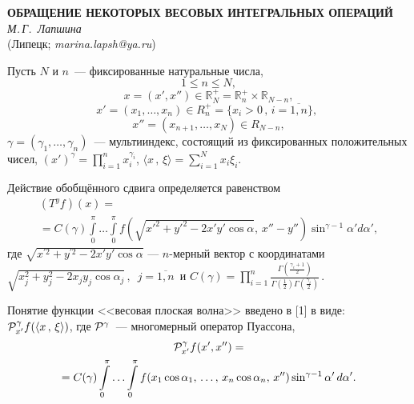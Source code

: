 \begin{center}{
	\bf
	ОБРАЩЕНИЕ НЕКОТОРЫХ ВЕСОВЫХ ИНТЕГРАЛЬНЫХ ОПЕРАЦИЙ
} \\
{\it М.\,Г.~Лапшина } \\
(Липецк; {\it marina.lapsh@ya.ru})
\end{center}


Пусть $N$ и $n$~--- фиксированные натуральные числа,
$$1\leqslant n\leqslant N,$$
$$x=(x',x'')\in \mathbb{R}_N^+=\mathbb{R}_n^+\times\mathbb{R}_{N-n},$$
$$
x'=(x_1,\ldots,x_n)\in R_n^+=\{x_i>0\,,\, i=\overline{1,n}\},\,\,
$$
$$
x''=(x_{n+1},\ldots,x_N)\in R_{N-n},
$$
$\gamma=(\gamma_1,\ldots,\gamma_n)$~--- мультииндекс, состоящий из
фиксированных положительных чисел, $(x')^\gamma=\prod_{i=1}^n x_i^{\gamma_i}$,
$\langle x\,,\,\xi\rangle{=}\sum_{i=1}^{N}x_i\xi_i$.

Действие обобщённого сдвига определяется  равенством
\begin{multline*}
(T^y f)(x)=
\\=
C(\gamma)\int\limits_{0}^{\pi}
\ldots \int\limits_{0}^{\pi}
f\left(\sqrt{x'^2{+}y'^2{-}2x'y'\cos\alpha},\,
 x''{-}y''\right)\sin^{\gamma-1}\alpha' d\alpha',
\end{multline*}
где $\sqrt{x^{'2}+y^{'2}-2x'y'\cos\alpha}$ --- $n$-мерный вектор  с координатами\\
$\sqrt{x_j^{2}+y_j^{2}-2x_jy_j\cos\alpha_j}\,,\,\,\, j=\overline{1,n}$\, и
$
C(\gamma)=\prod\limits_{i=1}^n\frac{\Gamma\left(\frac{\gamma_i+1}{2}\right)}
{\Gamma\left(\frac{1}{2}\right)\Gamma\left(\frac{\gamma_i}{2}\right)}\,.
$

Понятие функции <<весовая плоская волна>> введено в [1] в виде:
${\cal P}^\gamma_{x'} f(\langle x\,,\,\xi\rangle)$,
где ${\cal P}^\gamma$~--- многомерный оператор Пуассона,
\begin{multline*}
{\cal P}^\gamma_{x'} f(x',x'')=
\\=
C(\gamma)
\int\limits_0^\pi\ldots\int\limits_0^\pi f(x_1\cos\alpha_1,\,\ldots,\,x_n\cos\alpha_n,\,x'')
\sin^{\gamma-1}\alpha'\,d\alpha'.
\end{multline*}

